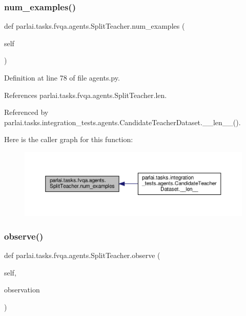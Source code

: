 \subsubsection{\texorpdfstring{num\+\_\+examples()}{num\_examples()}}
{\footnotesize\ttfamily def parlai.\+tasks.\+fvqa.\+agents.\+Split\+Teacher.\+num\+\_\+examples (\begin{DoxyParamCaption}\item[{}]{self }\end{DoxyParamCaption})}



Definition at line 78 of file agents.\+py.



References parlai.\+tasks.\+fvqa.\+agents.\+Split\+Teacher.\+len.



Referenced by parlai.\+tasks.\+integration\+\_\+tests.\+agents.\+Candidate\+Teacher\+Dataset.\+\_\+\+\_\+len\+\_\+\+\_\+().

Here is the caller graph for this function\+:
\nopagebreak
\begin{figure}[H]
\begin{center}
\leavevmode
\includegraphics[width=350pt]{classparlai_1_1tasks_1_1fvqa_1_1agents_1_1SplitTeacher_a62ae4928ac59b31290846ac15a59c17a_icgraph}
\end{center}
\end{figure}
\mbox{\label{classparlai_1_1tasks_1_1fvqa_1_1agents_1_1SplitTeacher_accfbbfff00298445b8b33dbe5cbfe40f}} 
\subsubsection{\texorpdfstring{observe()}{observe()}}
{\footnotesize\ttfamily def parlai.\+tasks.\+fvqa.\+agents.\+Split\+Teacher.\+observe (\begin{DoxyParamCaption}\item[{}]{self,  }\item[{}]{observation }\end{DoxyParamCaption})}

